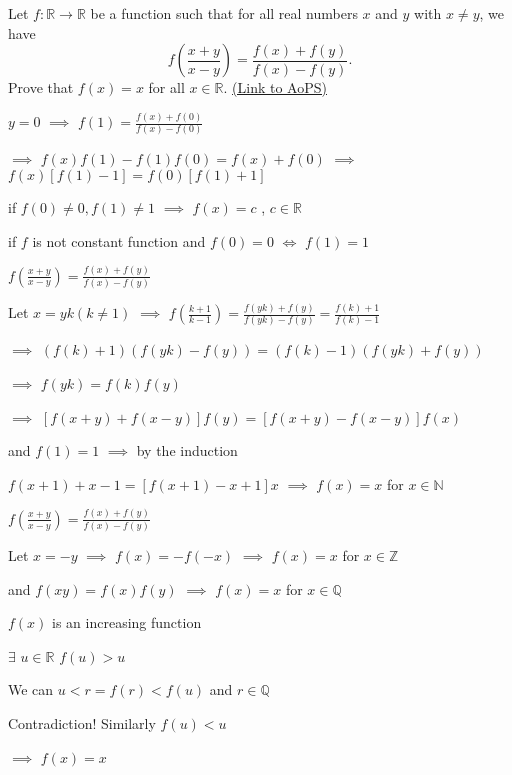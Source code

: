 \begin{problem}
	Let $ f: \mathbb {R} \to \mathbb{R}$ be a function such that for all real numbers $x$ and $y$ with $x \neq y$, we have 
\[ f \left(\frac{x+y}{x-y} \right)=\frac{f(x)+f(y)}{f(x)-f(y)}.\]
Prove that $ f(x)=x$ for all $x \in \mathbb{R}$.
	\flushright \href{https://artofproblemsolving.com/community/c6h310591}{(Link to AoPS)}
\end{problem}



\begin{solution}
	$ y = 0$  $ \implies$  $ f(1) = \frac {f(x) + f(0)}{f(x) - f(0)}$

$ \implies$  $ f(x)f(1) - f(1)f(0) = f(x) + f(0)$  $ \implies$  $ f(x)[f(1) - 1] = f(0)[f(1) + 1]$

if $ f(0)\not = 0,f(1)\not = 1$  $ \implies$  $ f(x) = c$ , $ c\in\mathbb{R}$

if $ f$ is not constant function and $ f(0) = 0$ $ \iff$   $ f(1) = 1$

$ f(\frac {x + y}{x - y}) = \frac {f(x) + f(y)}{f(x) - f(y)}$

Let $ x = yk(k\not = 1)$  $ \implies$  $ f(\frac {k + 1}{k - 1}) = \frac {f(yk) + f(y)}{f(yk) - f(y)} = \frac {f(k) + 1}{f(k) - 1}$

$ \implies$  $ (f(k) + 1)(f(yk) - f(y)) = (f(k) - 1)(f(yk) + f(y))$

$ \implies$  $ f(yk) = f(k)f(y)$

$ \implies$  $ [f(x + y) + f(x - y)]f(y) = [f(x + y) - f(x - y)]f(x)$

and $ f(1) = 1$  $ \implies$  by the induction

$ f(x + 1) + x - 1 = [f(x + 1) - x + 1]x$  $ \implies$  $ f(x) = x$  for $ x\in \mathbb{N}$

$ f(\frac {x + y}{x - y}) = \frac {f(x) + f(y)}{f(x) - f(y)}$

Let $ x = - y$  $ \implies$  $ f(x) = - f( - x)$  $ \implies$ $ f(x) = x$  for $ x\in\mathbb{Z}$

and $ f(xy ) = f(x)f(y )$  $ \implies$  $ f( x ) = x$  for $ x\in\mathbb{Q}$

$ f(x)$ is an increasing function

$ \exists$ $ u\in\mathbb{R}$  $ f(u) > u$

We can $ u < r = f(r) < f(u)$ and $ r\in\mathbb{Q}$

Contradiction!  Similarly $ f(u) < u$

$ \implies$  $ f(x) = x$
\end{solution}



